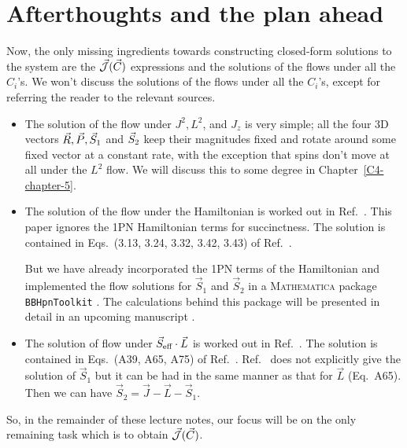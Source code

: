 \section{Afterthoughts and the plan ahead}



Now, the only missing ingredients towards constructing closed-form solutions
to the system are the $\vec{\mathcal{J}}(\vec{C})$ expressions and
the solutions of the flows under all the $C_i$'s.
We won't discuss the solutions of the flows under all the $C_i$'s, 
except for referring the reader to the relevant sources.
\begin{itemize}
\item The solution of the flow under $J^2, L^2$, and $J_z$ is very simple;
all the four 3D vectors 
$\vec{R}, \vec{P}, \vec{S}_1$ and $\vec{S}_2$ 
keep their magnitudes fixed and 
rotate around some fixed vector at a constant rate, with the exception that
spins don't move at all under the $L^2$ flow. We will discuss this 
to some degree in Chapter~\ref{C4-chapter-5}.
\item The solution of the flow under the Hamiltonian is worked out in 
Ref.~\cite{Cho:2019brd}. This paper ignores the 1PN Hamiltonian terms
for succinctness.
The solution is contained in Eqs.~(3.13, 3.24, 3.32, 3.42, 3.43)
of Ref.~\cite{Cho:2019brd}.

But we have already incorporated the 1PN terms of the Hamiltonian 
and implemented the flow solutions for $\vec{S}_1$ and $\vec{S}_2$ in a \textsc{Mathematica} package \texttt{BBHpnToolkit} \cite{MMA1}.
 The calculations behind this package will be presented in 
detail in an upcoming manuscript \cite{next_paper}.



\item The solution of flow under $\vec{S}_{\text{eff}}\cdot \vec{L}$ is worked out in 
Ref.~\cite{tanay2021action}.
The solution is contained in Eqs.~(A39, A65, A75)
of Ref.~\cite{tanay2021action}. Ref.~\cite{tanay2021action}
 does not explicitly give the solution
of $\vec{S}_1$ but it can be had in the 
same manner as that for $\vec{L}$ (Eq.~A65).
Then we can have $\vec{S}_2 = \vec{J} - \vec{L} -\vec{S}_1$.
\end{itemize}
So, in the remainder of these lecture notes, our focus will be on the only
remaining task which is to obtain $\vec{\mathcal{J}}(\vec{C})$.







